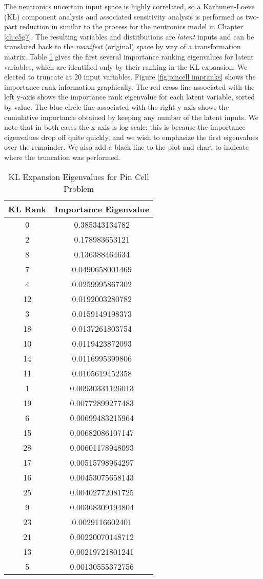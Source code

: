 The neutronics uncertain input space is highly correlated, so a Karhunen-Loeve (KL) component analysis and
associated sensitivity analysis is performed as
two-part reduction \cite{physor2016} in \raven{} similar to the process for the neutronics model
in Chapter \ref{ch:c5g7}.  The resulting variables and distributions are \emph{latent} inputs and can be
translated back to the \emph{manifest} (original) space by way of a transformation matrix.
Table \ref{tab:pcarank} gives the first several importance ranking eigenvalues for latent variables, which are
identified only by their ranking in the KL expansion.  We elected to truncate at 20 input variables.  
Figure \ref{fig:pincell impranks} shows the importance rank
information graphically.  The red cross line associated with the left y-axis shows the importance rank
eigenvalue for each latent variable, sorted by value.  The blue circle line associated with the right y-axis
shows the cumulative importance obtained by keeping any number of the latent inputs.  We note that in both
cases the x-axis is log scale; this is because the importance eigenvalues drop off quite quickly, and we wish
to emphasize the first eigenvalues over the remainder.  We also add a black line to the plot and chart
to indicate where the truncation was performed.

\begin{table}[H]
  \centering
  \begin{tabular}{c|c}
KL Rank & Importance Eigenvalue \\ \hline
0 & 0.385343134782 \\
2 & 0.178983653121 \\
8 & 0.136388464634 \\
7 & 0.0490658001469 \\
4 & 0.0259995867302 \\
12 & 0.0192003280782 \\
3 & 0.0159149198373 \\
18 & 0.0137261803754 \\
10 & 0.0119423872093 \\
14 & 0.0116995399806 \\
11 & 0.0105619452358 \\
1 & 0.00930331126013 \\
19 & 0.00772899277483 \\
6 & 0.00699483215964 \\
15 & 0.00682086107147 \\
28 & 0.00601178948093 \\
17 & 0.00515798964297 \\
16 & 0.00453075658143 \\
25 & 0.00402772081725 \\
9 & 0.00368309194804 \\ \hline
23 & 0.0029116602401 \\
21 & 0.00220070148712 \\
13 & 0.00219721801241 \\
5 & 0.00130555372756
\end{tabular}
\caption{KL Expansion Eigenvalues for Pin Cell Problem}
\label{tab:pcarank}
\end{table}

